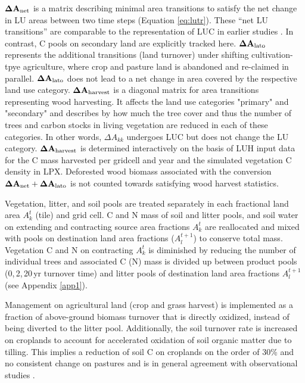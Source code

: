 $\mathbf{\Delta A}_{\mbox{\scriptsize net}}$ is a matrix describing minimal area transitions to satisfy the net change in LU areas between two time steps (Equation \ref{eq:lutr}). These ``net LU transitions'' are comparable to the representation of LUC in earlier studies \citep{strassmann08tel, stocker11bg}. In contrast, C pools on secondary land are explicitly tracked here. $\mathbf{\Delta A}_{\mbox{\scriptsize lato}}$ represents the additional transitions (land turnover) under shifting cultivation-tpye agriculture, where crop and pasture land is abandoned and re-claimed in parallel. $\mathbf{\Delta A}_{\mbox{\scriptsize lato}}$ does not lead to a net change in area covered by the respective land use category. $\mathbf{\Delta A}_{\mbox{\scriptsize harvest}}$ is a diagonal matrix for area transitions representing wood harvesting. It affects the land use categories "primary" and "secondary" and describes by how much the tree cover and thus the number of trees and carbon stocks in living vegetation are reduced in each of these categories. In other words, $\Delta A_{kk}$ undergoes LUC but does not change the LU category. $\mathbf{\Delta A}_{\mbox{\scriptsize harvest}}$ is determined interactively on the basis of LUH input data for the C mass harvested per gridcell and year and the simulated vegetation C density in LPX. Deforested wood biomass associated with the conversion $\mathbf{\Delta A}_{\mbox{\scriptsize net}} + \mathbf{\Delta A}_{\mbox{\scriptsize lato}}$ is not counted towards satisfying wood harvest statistics.

Vegetation, litter, and soil pools are treated separately in each fractional land area $A_k^t$ (tile) and grid cell. C and N mass of soil and litter pools, and soil water on extending and contracting source area fractions $A_k^t$ are reallocated and mixed with pools on destination land area fractions ($A_l^{t+1}$) to conserve total mass. Vegetation C and N on contracting $A_k^t$ is diminished by reducing the number of individual trees and associated C (N) mass is divided up between product pools (0,\,2,\,20\,yr turnover time) and litter pools of destination land area fractions $A_l^{t+1}$ (see Appendix \ref{app1}). 

Management on agricultural land (crop and grass harvest) is implemented as a fraction of above-ground biomass turnover that is directly oxidized, instead of being diverted to the litter pool. Additionally, the soil turnover rate is increased on croplands to account for accelerated oxidation of soil organic matter due to tilling. This implies a reduction of soil C on croplands on the order of 30\% and no consistent change on pastures and is in general agreement with observational studies \citep{davidson93,guogifford02gcb,murty02gcb,ogle05bgchem}.

